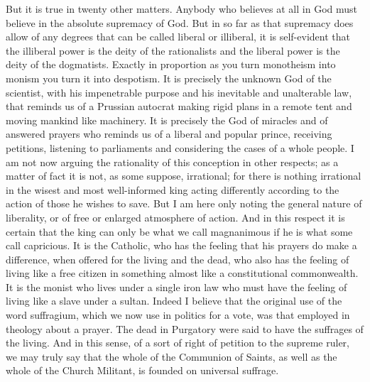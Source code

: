 But it is true in twenty other matters. Anybody who believes at all in God must believe in the absolute supremacy of God. But in so far as that supremacy does allow of any degrees that can be called liberal or illiberal, it is self-evident that the illiberal power is the deity of the rationalists and the liberal power is the deity of the dogmatists. Exactly in proportion as you turn monotheism into monism you turn it into despotism. It is precisely the unknown God of the scientist, with his impenetrable purpose and his inevitable and unalterable law, that reminds us of a Prussian autocrat making rigid plans in a remote tent and moving mankind like machinery. It is precisely the God of miracles and of answered prayers who reminds us of a liberal and popular prince, receiving petitions, listening to parliaments and considering the cases of a whole people. I am not now arguing the rationality of this conception in other respects; as a matter of fact it is not, as some suppose, irrational; for there is nothing irrational in the wisest and most well-informed king acting differently according to the action of those he wishes to save. But I am here only noting the general nature of liberality, or of free or enlarged atmosphere of action. And in this respect it is certain that the king can only be what we call magnanimous if he is what some call capricious. It is the Catholic, who has the feeling that his prayers do make a difference, when offered for the living and the dead, who also has the feeling of living like a free citizen in something almost like a constitutional commonwealth. It is the monist who lives under a single iron law who must have the feeling of living like a slave under a sultan. Indeed I believe that the original use of the word suffragium, which we now use in politics for a vote, was that employed in theology about a prayer. The dead in Purgatory were said to have the suffrages of the living. And in this sense, of a sort of right of petition to the supreme ruler, we may truly say that the whole of the Communion of Saints, as well as the whole of the Church Militant, is founded on universal suffrage.

